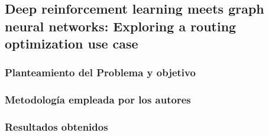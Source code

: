 \subsection{Deep reinforcement learning meets graph neural networks: Exploring a routing optimization use case \citep*{ALMASAN}}
\subsubsection{Planteamiento del Problema y objetivo }
\subsubsection{Metodología empleada por los autores}
\subsubsection{Resultados obtenidos}
